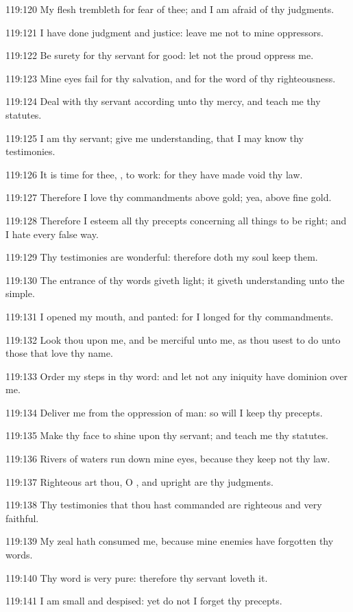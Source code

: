 119:120 My flesh trembleth for fear of thee; and I am afraid of thy
judgments.

119:121 I have done judgment and justice: leave me not to mine
oppressors.

119:122 Be surety for thy servant for good: let not the proud oppress
me.

119:123 Mine eyes fail for thy salvation, and for the word of thy
righteousness.

119:124 Deal with thy servant according unto thy mercy, and teach me
thy statutes.

119:125 I am thy servant; give me understanding, that I may know thy
testimonies.

119:126 It is time for thee, \LORD, to work: for they have made void
thy law.

119:127 Therefore I love thy commandments above gold; yea, above fine
gold.

119:128 Therefore I esteem all thy precepts concerning all things to
be right; and I hate every false way.

119:129 Thy testimonies are wonderful: therefore doth my soul keep
them.

119:130 The entrance of thy words giveth light; it giveth
understanding unto the simple.

119:131 I opened my mouth, and panted: for I longed for thy
commandments.

119:132 Look thou upon me, and be merciful unto me, as thou usest to
do unto those that love thy name.

119:133 Order my steps in thy word: and let not any iniquity have
dominion over me.

119:134 Deliver me from the oppression of man: so will I keep thy
precepts.

119:135 Make thy face to shine upon thy servant; and teach me thy
statutes.

119:136 Rivers of waters run down mine eyes, because they keep not thy
law.

119:137 Righteous art thou, O \LORD, and upright are thy judgments.

119:138 Thy testimonies that thou hast commanded are righteous and
very faithful.

119:139 My zeal hath consumed me, because mine enemies have forgotten
thy words.

119:140 Thy word is very pure: therefore thy servant loveth it.

119:141 I am small and despised: yet do not I forget thy precepts.

